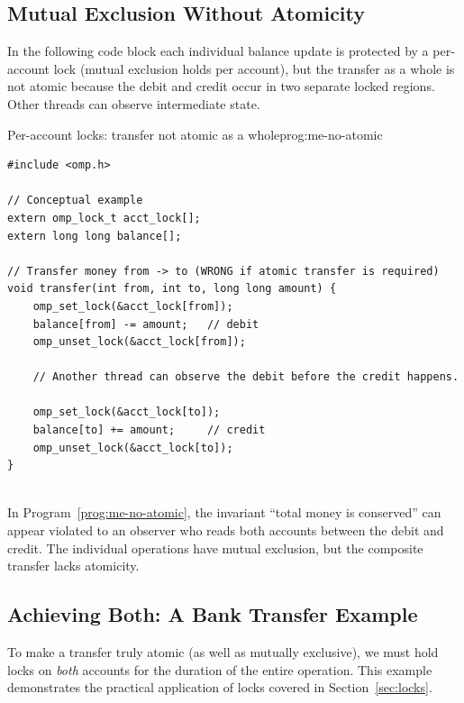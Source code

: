 \subsection{Mutual Exclusion Without Atomicity}

\begin{ppexample}
 In the following code block each individual balance update is protected by a per-account lock (mutual exclusion holds per account), but the transfer as a whole is not atomic because the debit and credit occur in two separate locked regions. Other threads can observe intermediate state.
\end{ppexample}

\begin{ppprogram}{Per-account locks: transfer not atomic as a whole}{prog:me-no-atomic}
\begin{lstlisting}[language=OpenMP]
#include <omp.h>

// Conceptual example
extern omp_lock_t acct_lock[];
extern long long balance[];

// Transfer money from -> to (WRONG if atomic transfer is required)
void transfer(int from, int to, long long amount) {
    omp_set_lock(&acct_lock[from]);
    balance[from] -= amount;   // debit
    omp_unset_lock(&acct_lock[from]);

    // Another thread can observe the debit before the credit happens.

    omp_set_lock(&acct_lock[to]);
    balance[to] += amount;     // credit
    omp_unset_lock(&acct_lock[to]);
}
\end{lstlisting}
\end{ppprogram}

\begin{pppitfall}
\\ In Program~\ref{prog:me-no-atomic}, the invariant ``total money is conserved'' can appear violated to an observer who reads both accounts between the debit and credit. The individual operations have mutual exclusion, but the composite transfer lacks atomicity.
\end{pppitfall}

\subsection{Achieving Both: A Bank Transfer Example}
\label{sec:bank-transfer}

To make a transfer truly atomic (as well as mutually exclusive), we must hold locks on \emph{both} accounts for the duration of the entire operation. This example demonstrates the practical application of locks covered in Section~\ref{sec:locks}.

